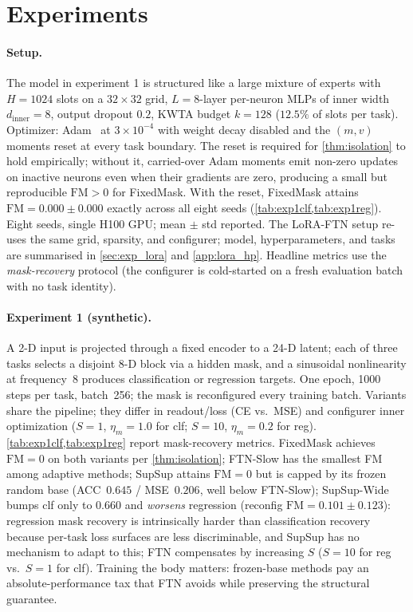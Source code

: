 \documentclass{article}
\theoremstyle{plain}
\theoremstyle{remark}
\begin{document}
\section{Experiments}
\label{sec:experiments}

\paragraph{Setup.}
\label{sec:setup}
The model in experiment 1 is structured like a large mixture of experts with $H{=}1024$ slots on a $32\times 32$ grid, $L{=}8$-layer per-neuron MLPs of inner width $d_\mathrm{inner}{=}8$, output dropout $0.2$, KWTA budget $k{=}128$ ($12.5\%$ of slots per task). Optimizer: Adam~\citep{kingma2015adam} at $3\times 10^{-4}$ with weight decay disabled and the $(m,v)$ moments reset at every task boundary. The reset is required for \cref{thm:isolation} to hold empirically; without it, carried-over Adam moments emit non-zero updates on inactive neurons even when their gradients are zero, producing a small but reproducible $\mathrm{FM}>0$ for FixedMask. With the reset, FixedMask attains $\mathrm{FM}=0.000\pm 0.000$ exactly across all eight seeds (\cref{tab:exp1clf,tab:exp1reg}). Eight seeds, single H100 GPU; mean $\pm$ std reported. The LoRA-FTN setup re-uses the same grid, sparsity, and configurer; model, hyperparameters, and tasks are summarised in \cref{sec:exp_lora} and \cref{app:lora_hp}. Headline metrics use the \emph{mask-recovery} protocol (the configurer is cold-started on a fresh evaluation batch with no task identity).

\paragraph{Experiment 1 (synthetic).}
\label{sec:exp1}
A 2-D input is projected through a fixed encoder to a 24-D latent; each of three tasks selects a disjoint 8-D block via a hidden mask, and a sinusoidal nonlinearity at frequency~8 produces classification or regression targets. One epoch, 1000 steps per task, batch~256; the mask is reconfigured every training batch. Variants share the pipeline; they differ in readout/loss (CE vs.~MSE) and configurer inner optimization ($S{=}1$, $\eta_m{=}1.0$ for clf; $S{=}10$, $\eta_m{=}0.2$ for reg). \cref{tab:exp1clf,tab:exp1reg} report mask-recovery metrics. FixedMask achieves $\mathrm{FM}=0$ on both variants per \cref{thm:isolation}; FTN-Slow has the smallest FM among adaptive methods; SupSup attains $\mathrm{FM}=0$ but is capped by its frozen random base (ACC~$0.645$ / MSE~$0.206$, well below FTN-Slow); SupSup-Wide bumps clf only to $0.660$ and \emph{worsens} regression (reconfig $\mathrm{FM}=0.101\pm 0.123$): regression mask recovery is intrinsically harder than classification recovery because per-task loss surfaces are less discriminable, and SupSup has no mechanism to adapt to this; FTN compensates by increasing $S$ ($S{=}10$ for reg vs.\ $S{=}1$ for clf). Training the body matters: frozen-base methods pay an absolute-performance tax that FTN avoids while preserving the structural guarantee.
\end{document}
